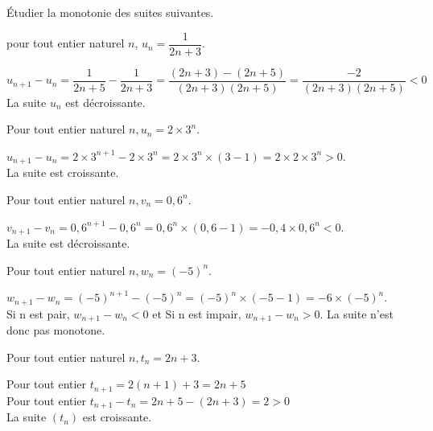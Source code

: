 \documentclass[12pt,a4paper]{article}  %
\begin{document}
Étudier la monotonie des suites suivantes.
\begin{enumMet}
    \item pour tout entier naturel $n$, $u_{n}=\dfrac{1}{2 n+3}$.\\
    \begin{corrBox}
        $u_{n+1}-u_n=\dfrac{1}{2n+5}-\dfrac{1}{2n+3}=\dfrac{(2n+3)-(2n+5)}{(2n+3)(2n+5)}=\dfrac{-2}{(2n+3)(2n+5)}<0$\\
        La suite $u_n$ est décroissante. 
    \end{corrBox}
    \item Pour tout entier naturel $n, u_{n}=2\times3^{n}$.\\
    \begin{corrBox}
        $u_{n+1}-u_n=2\times3^{n+1}-2\times3^n=2\times3^n\times(3-1)=2\times2\times3^n>0$.\\
        La suite est croissante.
    \end{corrBox}
    \item Pour tout entier naturel $n, v_{n}=0,6^{n}$.\\
    \begin{corrBox}
        $v_{n+1}-v_n=0,6^{n+1}-0,6^n=0,6^n\times(0,6-1)=-0,4\times0,6^n<0$.\\
        La suite est décroissante.
    \end{corrBox}
    \item Pour tout entier naturel $n, w_{n}=(-5)^{n}$.\\
    \begin{corrBox}
        $w_{n+1}-w_n=(-5)^{n+1}-(-5)^n=(-5)^n\times(-5-1)=-6\times(-5)^n$.\\
        Si n est pair, $w_{n+1}-w_n<0$ et Si n est impair, $w_{n+1}-w_n>0$. La suite n'est donc pas monotone.
    \end{corrBox}
    \item {} Pour tout entier naturel $n, t_{n}=2 n+3$.\\
    \begin{corrBox}
        Pour tout entier $t_{n+1}=2(n+1)+3=2n+5$\\
        Pour tout entier $t_{n+1}-t_{n}=2n+5-(2n+3)=2>0$\\
        La suite $\left(t_{n}\right)$ est croissante.\\
    \end{corrBox}
\end{enumMet}
\end{document}
